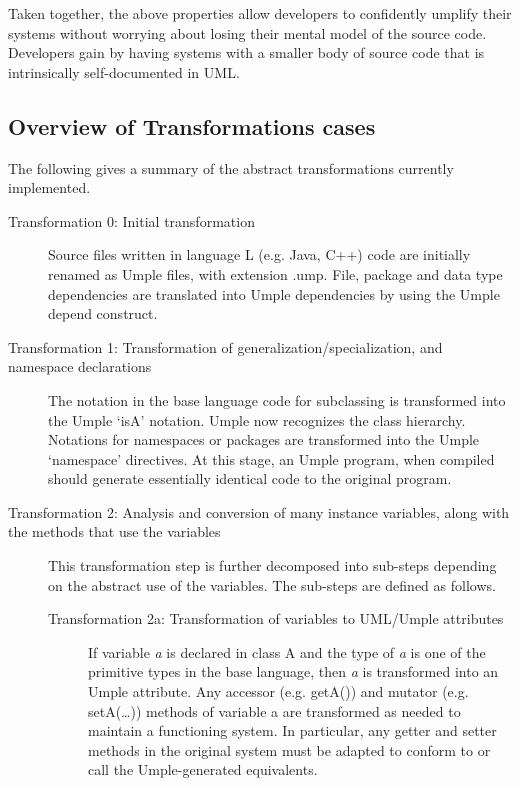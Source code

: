 Taken together, the above properties allow developers to confidently umplify their systems without worrying about losing their mental model of the source code. Developers gain by having systems with a smaller body of source code that is intrinsically self-documented in UML. 

\subsection{Overview of Transformations cases}
\label{subsection:overview}
The following gives a summary of the abstract transformations currently implemented. 
\begin{description} 
\item[Transformation 0: Initial transformation] 
Source files written in language L (e.g. Java, C++) code are initially renamed as Umple files, with extension .ump. File, package and data type dependencies are translated into Umple dependencies by using the Umple depend construct. 

\item [Transformation 1: Transformation of generalization/specialization, and namespace declarations]
The notation in the base language code for subclassing is transformed into the Umple `isA' notation. Umple now recognizes the class hierarchy. Notations for namespaces or packages are transformed into the Umple `namespace' directives. At this stage, an Umple program, when compiled should generate essentially identical code to the original program.

\item [Transformation 2: Analysis and conversion of many instance variables, along with the methods that use the variables]
This transformation step is further decomposed into sub-steps depending on the abstract use of the variables. The sub-steps are defined as follows.
	\begin{description}

	\item [Transformation 2a: Transformation of variables to UML/Umple attributes]
	If variable \textit{a} is declared in class A and the type of \textit{a} is one of the primitive types in the base language, then \textit{a} is transformed into an Umple attribute. Any accessor (e.g. getA()) and mutator (e.g. setA(…)) methods of variable a are transformed as needed to maintain a functioning system. In particular, any getter and setter methods in the original system must be adapted to conform to or call the Umple-generated equivalents.
	

\end{description}
\end{description}
